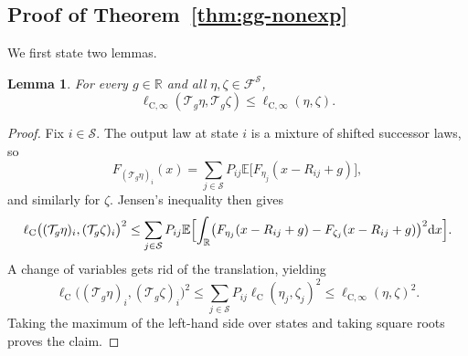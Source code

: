 \documentclass{article}
\newtheorem{lemma}[theorem]{Lemma}
\newcommand{\X}{\mathcal{S}}
\newcommand{\R}{\mathbb{R}}
\newcommand{\E}{\mathbb{E}}
\begin{document}
\subsection{Proof of Theorem~\ref{thm:gg-nonexp}}
We first state two lemmas.
\begin{lemma}\label{lem:applemma1}
For every $g \in \R$ and all $\eta, \zeta \in \mathcal F^\X$,
\begin{equation}
\ell_{\mathrm C, \infty}(\mathcal T_g\eta, \mathcal T_g\zeta) \le \ell_{\mathrm C, \infty}(\eta, \zeta).
\end{equation}
\end{lemma}
\begin{proof}
Fix $i \in \X$. The output law at state $i$ is a mixture of shifted successor laws, so
\begin{equation}
F_{(\mathcal T_g \eta)_i}(x) = \sum_{j\in\X} P_{ij}\E\bigl[F_{\eta_j}(x-
R_{ij}+g) \bigr],
\end{equation}
and similarly for $\zeta$. Jensen's inequality then gives
\begin{equation}
\ell_{\mathrm C}\bigl((\mathcal T_g\eta)_i, (\mathcal T_g\zeta)_i \bigr)^2 \le \sum_{j \in \X}P_{ij}\E\Bigl[\int_\R\bigl(F_{\eta_j}(x-R_{ij}+g) - F_{\zeta_j}(x-R_{ij}+g)\bigr)^2 \mathrm dx \Bigr].
\end{equation}
A change of variables gets rid of the translation, yielding
\begin{equation}
\ell_{\mathrm C}\bigl((\mathcal T_g\eta)_i, (\mathcal T_g\zeta)_i \bigr)^2 \le \sum_{j \in \X} P_{ij} \ell_{\mathrm C}(\eta_j, \zeta_j)^2 \le \ell_{\mathrm C, \infty}(\eta, \zeta)^2.
\end{equation}
Taking the maximum of the left-hand side over states and taking square roots proves the claim.
\end{proof}
\end{document}
